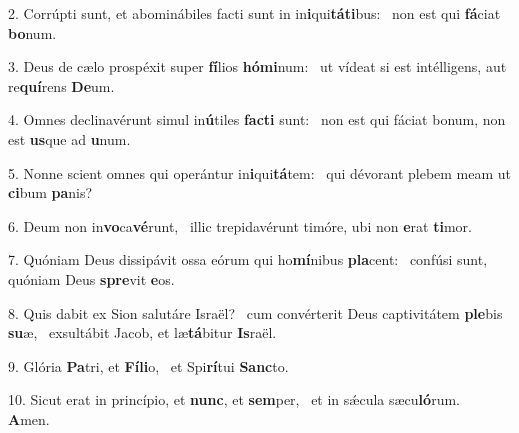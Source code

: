 2. Corrúpti sunt, et abominábiles facti sunt in in\textbf{i}qui\textbf{tá}\textbf{ti}bus: \ast\  non est qui \textbf{fá}ciat \textbf{bo}num.\

3. Deus de cælo prospéxit super \textbf{fí}lios \textbf{hó}\textbf{mi}num: \ast\  ut vídeat si est intélligens, aut re\textbf{quí}rens \textbf{De}um.\

4. Omnes declinavérunt simul in\textbf{ú}tiles \textbf{fac}\textbf{ti} sunt: \ast\  non est qui fáciat bonum, non est \textbf{us}que ad \textbf{u}num.\

5. Nonne scient omnes qui operántur in\textbf{i}qui\textbf{tá}tem: \ast\  qui dévorant plebem meam ut \textbf{ci}bum \textbf{pa}nis?\

6. Deum non in\textbf{vo}ca\textbf{vé}runt, \ast\  illic trepidavérunt timóre, ubi non \textbf{e}rat \textbf{ti}mor.\

7. Quóniam Deus dissipávit ossa eórum qui ho\textbf{mí}nibus \textbf{pla}cent: \ast\  confúsi sunt, quóniam Deus \textbf{spre}vit \textbf{e}os.\

8. Quis dabit ex Sion salutáre Israël? \dag\  cum convérterit Deus captivitátem \textbf{ple}bis \textbf{su}æ, \ast\  exsultábit Jacob, et læ\textbf{tá}bitur \textbf{Is}raël.\

9. Glória \textbf{Pa}tri, et \textbf{Fí}\textbf{li}o, \ast\  et Spi\textbf{rí}tui \textbf{Sanc}to.\

10. Sicut erat in princípio, et \textbf{nunc}, et \textbf{sem}per, \ast\  et in sǽcula sæcu\textbf{ló}rum. \textbf{A}men.\

